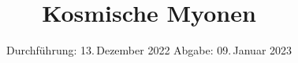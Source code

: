 

\subject{V01}
\title{Kosmische Myonen}
\date{%
  Durchführung: 13.\,Dezember 2022
  \hspace{2em}
  Abgabe: 09.\,Januar 2023
}



\maketitle
\thispagestyle{empty}
\tableofcontents
\newpage







\newpage
\printbibliography{}


